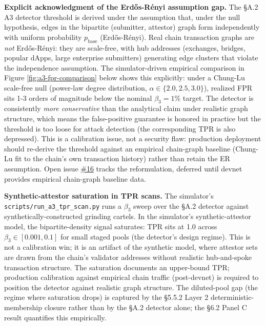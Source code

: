 \documentclass[
  11pt,
]{article}
\begin{document}
\textbf{Explicit acknowledgment of the Erdős-Rényi assumption gap.} The
§A.2 A3 detector threshold is derived under the assumption that, under
the null hypothesis, edges in the bipartite (submitter, attestor) graph
form independently with uniform probability \(p_{\text{base}}\)
(Erdős-Rényi). Real chain transaction graphs are \emph{not} Erdős-Rényi:
they are scale-free, with hub addresses (exchanges, bridges, popular
dApps, large enterprise submitters) generating edge clusters that
violate the independence assumption. The simulator-driven empirical
comparison in Figure \ref{fig:a3-fpr-comparison} below shows this
explicitly: under a Chung-Lu scale-free null (power-law degree
distribution, \(\alpha \in \{2.0, 2.5, 3.0\}\)), realized FPR sits 1-3
orders of magnitude below the nominal \(\beta_3 = 1\%\) target. The
detector is consistently \emph{more conservative} than the analytical
claim under realistic graph structure, which means the false-positive
guarantee is honored in practice but the threshold is too loose for
attack detection (the corresponding TPR is also depressed). This is a
calibration issue, not a security flaw: production deployment should
re-derive the threshold against an empirical chain-graph baseline
(Chung-Lu fit to the chain's own transaction history) rather than retain
the ER assumption. Open issue
\href{https://github.com/ligate-io/ligate-research/issues/16}{\#16}
tracks the reformulation, deferred until devnet provides empirical
chain-graph baseline data.

\textbf{Synthetic-attestor saturation in TPR scans.} The simulator's
\texttt{scripts/run\_a3\_tpr\_scan.py} runs a \(\beta_3\) sweep over the
§A.2 detector against synthetically-constructed grinding cartels. In the
simulator's synthetic-attestor model, the bipartite-density signal
saturates: TPR sits at 1.0 across \(\beta_3 \in [0.001, 0.1]\) for small
staged pools (the detector's design regime). This is not a calibration
win; it is an artifact of the synthetic model, where attestor sets are
drawn from the chain's validator addresses without realistic
hub-and-spoke transaction structure. The saturation documents an
upper-bound TPR; production calibration against empirical chain traffic
(post-devnet) is required to position the detector against realistic
graph structure. The diluted-pool gap (the regime where saturation
drops) is captured by the §5.5.2 Layer 2 deterministic-membership
closure rather than by the §A.2 detector alone; the §6.2 Panel C result
quantifies this empirically.
\end{document}

